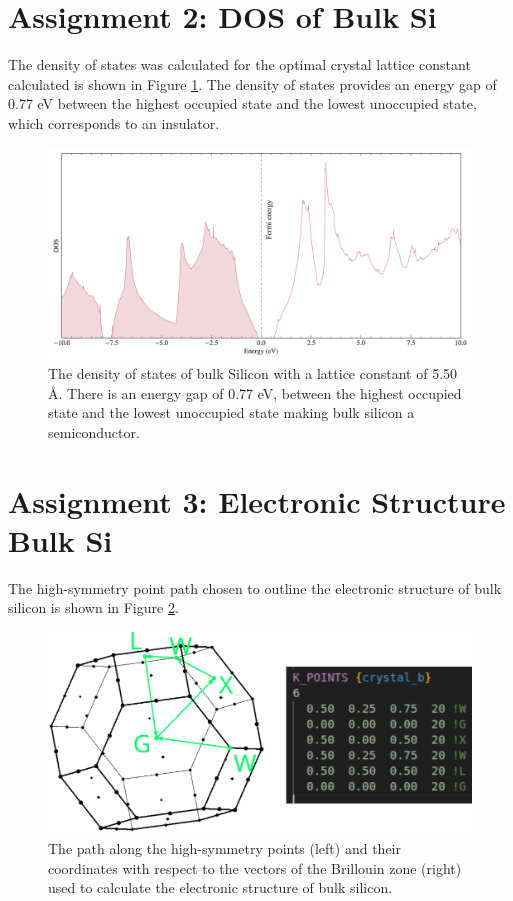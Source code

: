 \documentclass[10pt,a4paper]{labreport}
\begin{document}
\newpage
\section{Assignment 2: DOS of Bulk Si}
The density of states was calculated for the optimal crystal lattice constant calculated is shown in Figure \ref{fig:ass2}. The density of states provides an energy gap of 0.77 eV between the highest occupied state and the lowest unoccupied state, which corresponds to an insulator. 

\begin{figure}[h]
    \centering 
    \includegraphics[width = 0.7 \textwidth]{figs/ass2_dos.png}
    \caption{The density of states of bulk Silicon with a lattice constant of 5.50 \AA. There is an energy gap of 0.77 eV, between the highest occupied state and the lowest unoccupied state making bulk silicon a semiconductor.}
    \label{fig:ass2}
\end{figure}

\newpage
\section{Assignment 3: Electronic Structure Bulk Si}
The high-symmetry point path chosen to outline the electronic structure of bulk silicon is shown in Figure \ref{fig:ass3_kpoints}. 

\begin{figure}[h]
    \centering 
    \includegraphics[width = 0.7 \textwidth]{figs/ass3_kpoints.png}
    \caption{The path along the high-symmetry points (left) and their coordinates with respect to the vectors of the Brillouin zone (right) used to calculate the electronic structure of bulk silicon.}
    \label{fig:ass3_kpoints}
\end{figure}
\end{document}
